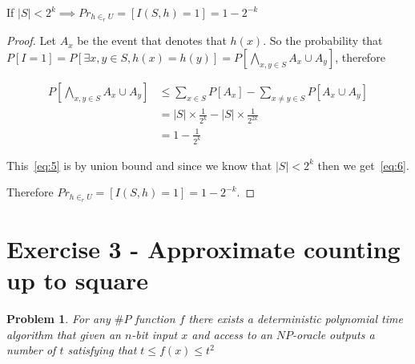 \documentclass[12pt, a4paper]{article}
\begin{document}
\begin{2k}
  If $|S| < 2^k \implies Pr_{h \in_r U} = \left[ I(S,h) = 1 \right] = 1 - 2^{-k}$
\end{2k}

\begin{proof}
  Let $A_x$ be the event that denotes that $h(x)$. So the probability that $P[I = 1] = P[ \exists x,y \in S, h(x) = h(y)] = P[ \bigwedge_{x,y \in S}  A_x \cup A_y]$, therefore

  \begin{subequations}
    \begin{align}
      P[ \bigwedge_{x,y \in S}  A_x \cup A_y] &\leq \sum_{x \in S} P[A_x] - \sum_{x \neq y \in S} P[A_x \cup A_y] \label{eq:5}\\
      &= |S| \times \frac{1}{2^k} - |S| \times \frac{1}{2^{2k}}\\
      &= 1 - \frac{1}{2^k} \label{eq:6}
    \end{align}
  \end{subequations}

  This~\ref{eq:5} is by union bound and since we know that $|S| < 2^k$ then we get~\ref{eq:6}.

  Therefore $Pr_{h \in_r U} = \left[ I(S,h) = 1 \right] = 1 - 2^{-k}$.

\end{proof}

\section{Exercise 3 - Approximate counting up to square}
\newtheorem{a-counting}{Problem}
\begin{a-counting}
  For any $\#P$ function $f$ there exists a \textit{deterministic} polynomial time algorithm that given an $n$-bit input $x$ and access to an $NP$-oracle outputs a number of $t$ satisfying that $t \leq f(x) \leq t^2$
\end{a-counting}
\end{document}
